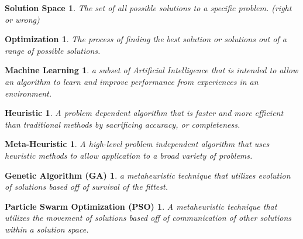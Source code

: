 \documentclass[twocolumn]{article}
\newtheorem*{sos*}{Solution Space}
\newtheorem*{op*}{Optimization}
\newtheorem*{ml*}{Machine Learning}
\newtheorem*{he*}{Heuristic}
\newtheorem*{me*}{Meta-Heuristic}
\newtheorem*{ga*}{Genetic Algorithm (GA)}
\newtheorem*{pso*}{Particle Swarm Optimization (PSO)}
\begin{document}
\begin{sos*}
The set of all possible solutions to a specific problem. (right or wrong)
\end{sos*}

\begin{op*}
The process of finding the best solution or solutions out of a range of possible solutions.
\end{op*}

\begin{ml*}
a subset of Artificial Intelligence that is intended to allow an algorithm to learn and improve performance from experiences in an environment. 
\end{ml*}

\begin{he*}
A problem dependent algorithm that is faster and more efficient than traditional methods by sacrificing accuracy, or completeness.
\end{he*}

\begin{me*}
A high-level problem independent algorithm that uses heuristic methods to allow application to a broad variety of problems.
\end{me*}

\begin{ga*}
a metaheuristic technique that utilizes evolution of solutions based off of survival of the fittest.
\end{ga*}

\begin{pso*}
A metaheuristic technique that utilizes the movement of solutions based off of communication of other solutions within a solution space.
\end{pso*}
\end{document}
